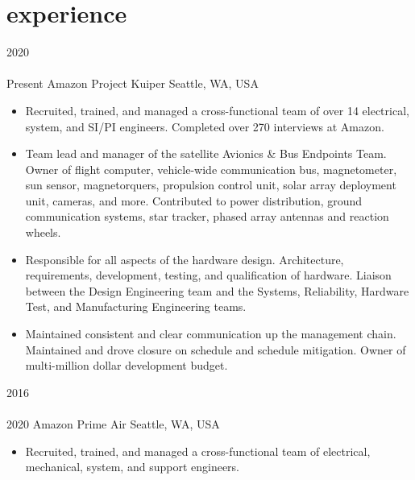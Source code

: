 
\section{experience}

\begin{entrylist}
\entry
  {2020\\\faChevronDown\\Present}
  {Amazon Project Kuiper}
  {Seattle, WA, USA}
  {
\begin{itemize}[leftmargin=12pt]
  \item Recruited, trained, and managed a cross-functional team of over 14 electrical, system, and SI/PI engineers. Completed over 270 interviews at Amazon.
  \item Team lead and manager of the satellite Avionics \& Bus Endpoints Team. Owner of flight computer, vehicle-wide communication bus, magnetometer, sun sensor, magnetorquers, propulsion control unit, solar array deployment unit, cameras, and more. Contributed to power distribution, ground communication systems, star tracker, phased array antennas and reaction wheels.  
  \item Responsible for all aspects of the hardware design. Architecture, requirements, development, testing, and qualification of hardware. Liaison between the Design Engineering team and the Systems, Reliability, Hardware Test, and Manufacturing Engineering teams.
  \item Maintained consistent and clear communication up the management chain. Maintained and drove closure on schedule and schedule mitigation. Owner of multi-million dollar development budget. 
\end{itemize}
}
\entry
  {2016\\\faChevronDown\\2020}
  {Amazon Prime Air}
  {Seattle, WA, USA}
  {
\begin{itemize}[leftmargin=12pt]
  \item Recruited, trained, and managed a cross-functional team of electrical, mechanical, system, and support engineers.

\end{itemize}}
\end{entrylist}
